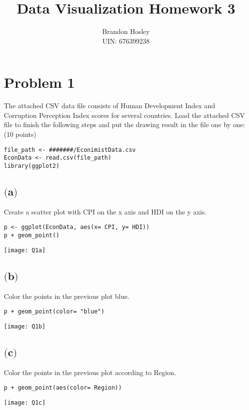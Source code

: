 \documentclass[a4paper,man,natbib]{apa6}
\title{Data Visualization Homework 3}
\author{Brandon Hosley \\ UIN: 676399238}
\date{}
\affiliation{Yanhui Guo, Ph.D}
\begin{document}
\maketitle
\singlespacing
\raggedbottom
	
\section{Problem 1}
The attached CSV data file consists of Human Development Index and Corruption Perception Index scores for several countries. Load the attached CSV file to finish the following steps and put the drawing result in the file one by one: (10 points) \\
\begin{verbatim}
file_path <- #######/EconimistData.csv
EconData <- read.csv(file_path)
library(ggplot2)
\end{verbatim}

\subsection{$($a$)$}
Create a scatter plot with CPI on the x axis and HDI on the y axis. \\
\begin{verbatim}
p <- ggplot(EconData, aes(x= CPI, y= HDI))
p + geom_point()
\end{verbatim}
\texttt{[image: Q1a]}

\subsection{$($b$)$}
Color the points in the previous plot blue. \\
\begin{verbatim}
p + geom_point(color= "blue")
\end{verbatim}
\texttt{[image: Q1b]}

\pagebreak
\subsection{$($c$)$}
Color the points in the previous plot according to Region. \\
\begin{verbatim}
p + geom_point(aes(color= Region))
\end{verbatim}
\texttt{[image: Q1c]}
\end{document}
